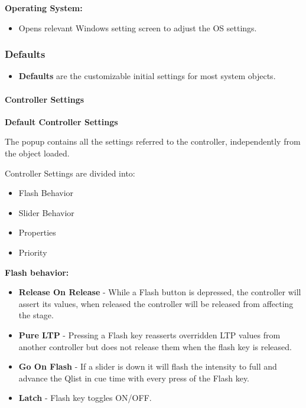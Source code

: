 \documentclass[
]{article}
\providecommand{\tightlist}{%
  \setlength{\itemsep}{0pt}\setlength{\parskip}{0pt}}
\begin{document}
\textbf{Operating System:}

\begin{itemize}
\tightlist
\item
  Opens relevant Windows setting screen to adjust the OS settings.
\end{itemize}

\hypertarget{defaults}{%
\subsubsection{Defaults}\label{defaults}}

\begin{itemize}
\tightlist
\item
  \textbf{Defaults} are the customizable initial settings for most system objects.
\end{itemize}

\hypertarget{controller-settings}{%
\paragraph{Controller Settings}\label{controller-settings}}

\textbf{Default Controller Settings}

The popup contains all the settings referred to the controller, independently from the object loaded.

Controller Settings are divided into:

\begin{itemize}
\item
  Flash Behavior
\item
  Slider Behavior
\item
  Properties
\item
  Priority
\end{itemize}

\textbf{Flash behavior:}

\begin{itemize}
\item
  \textbf{Release On Release} - While a Flash button is depressed, the controller will assert its values, when released the controller will be released from affecting the stage.
\item
  \textbf{Pure LTP} - Pressing a Flash key reasserts overridden LTP values from another controller but does not release them when the flash key is released.
\item
  \textbf{Go On Flash} - If a slider is down it will flash the intensity to full and advance the Qlist in cue time with every press of the Flash key.
\item
  \textbf{Latch} - Flash key toggles ON/OFF.
\end{itemize}
\end{document}

